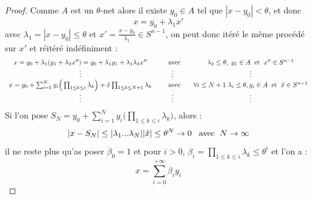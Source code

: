 \documentclass[12pt]{article}
\theoremstyle{definition}
\begin{document}
\begin{proof}
	Comme $A$ est un $\theta$-net alors il existe $y_0\in A$ tel que $|x-y_0|<\theta$, et donc
	\begin{equation*}
	x = y_0 + \lambda_1 x'
	\end{equation*}
	avec $\lambda_1= |x-y_0|\leq \theta$ et $x' = \frac{x-y_0}{\lambda_1}\in S^{n-1}$, on peut donc itéré le même procédé sur $x'$ et réitéré indéfiniment : 
	\begin{equation*}
	\begin{array}{ccc}
	x = y_0 + \lambda_1 (y_1+\lambda_2x'')=y_0+\lambda_1y_1+\lambda_1\lambda_2x'' &\text{\hspace{4mm} avec \hspace{2mm}}&  \lambda_2\leq \theta, \; y_1\in A \text{\hspace{2mm}et\hspace{2mm}} x''\in S^{n-1}\\
	\vdots&\vdots&\vdots\\
	x = y_0 + \sum_{i=1}^{N}y_i\Big(\prod_{1\leq k\leq i}\lambda_k\Big)+\tilde{x}\prod_{1\leq k\leq N+1}\lambda_k &\text{\hspace{4mm} avec \hspace{2mm}}&  \text{$\forall i\leq N+1$\hspace{1mm}} \lambda_i\leq \theta, y_i\in A \text{\hspace{2mm}et\hspace{2mm}} \tilde{x}\in S^{n-1}\\
	\vdots & \vdots & \vdots
	\end{array}
	\end{equation*} 
	Si l'on pose $S_N = y_0 + \sum_{i=1}^{N}y_i\Big(\prod_{1\leq k\leq i}\lambda_k\Big)$, alors :
	\begin{equation*}
	|x-S_N| \leq |\lambda_1 ... \lambda_N| |\tilde{x}|\leq \theta^{N} \to 0  \text{\hspace{3mm}avec\hspace{2mm}}  N\to \infty
	\end{equation*}
	il ne reste plus qu'as poser $\beta_0=1$ et pour $i>0$, $\beta_i=\prod_{1 \leq k\leq i}\lambda_k\leq \theta^i$ et l'on a :
	\begin{equation*}
	x = \sum_{i=0}^{+\infty} \beta_i y_i
	\end{equation*}
\end{proof}
\end{document}
